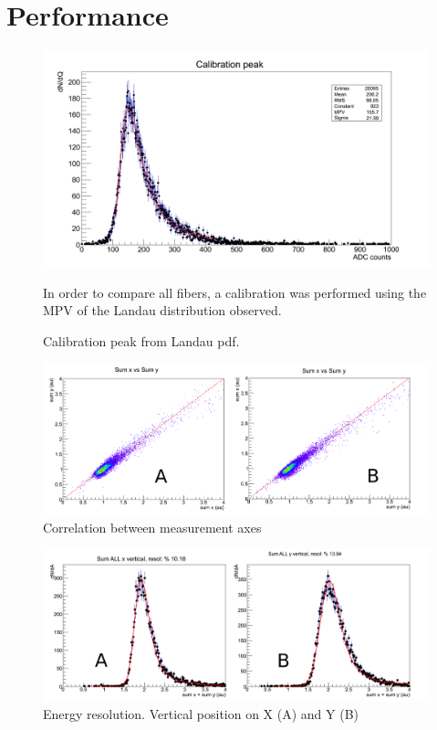 \documentclass[final,5p,times,twocolumn]{elsarticle}
\begin{document}
\section{Performance}
\begin{figure}
\includegraphics[width=0.98\columnwidth,keepaspectratio]{cal_peak}
\caption{Calibration peak from Landau pdf.}
In order to compare all fibers, a calibration was performed using the MPV of the Landau distribution observed.
\end{figure}
%
\begin{figure}
\includegraphics[width=0.98\columnwidth,keepaspectratio]{sumxy_comp}
\caption{Correlation between measurement axes}
\end{figure}
%
\begin{figure}
\includegraphics[width=0.98\columnwidth,keepaspectratio]{ps_res}
\caption{Energy resolution. Vertical position on X (A) and Y (B)}
\end{figure}
%
%
%
\end{document}
